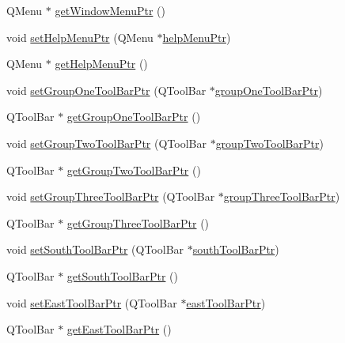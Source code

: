 \begin{DoxyCompactItemize}
\item 
Q\-Menu $\ast$ \hyperlink{class_master_gui_a68e66c032b5e7728e0a7e88a04575abc}{get\-Window\-Menu\-Ptr} ()
\item 
void \hyperlink{class_master_gui_a72a4772ee0ff74f6158f99e94c41189a}{set\-Help\-Menu\-Ptr} (Q\-Menu $\ast$\hyperlink{class_master_gui_a4125e9702c79a263642bf83f5f1e2192}{help\-Menu\-Ptr})
\item 
Q\-Menu $\ast$ \hyperlink{class_master_gui_a6eb5ec7778681673520dc9fffd080056}{get\-Help\-Menu\-Ptr} ()
\item 
void \hyperlink{class_master_gui_a83cb5a184a605d368841854ba1cb461b}{set\-Group\-One\-Tool\-Bar\-Ptr} (Q\-Tool\-Bar $\ast$\hyperlink{class_master_gui_a67441e41e16e245976536f18cd7f2d6d}{group\-One\-Tool\-Bar\-Ptr})
\item 
Q\-Tool\-Bar $\ast$ \hyperlink{class_master_gui_a7da1e17d6cfd6254a7b5da4be625e4ff}{get\-Group\-One\-Tool\-Bar\-Ptr} ()
\item 
void \hyperlink{class_master_gui_a677763f96267d87f843c61dff2d7e4ca}{set\-Group\-Two\-Tool\-Bar\-Ptr} (Q\-Tool\-Bar $\ast$\hyperlink{class_master_gui_aa2c7522e568a43f38861795af343bf76}{group\-Two\-Tool\-Bar\-Ptr})
\item 
Q\-Tool\-Bar $\ast$ \hyperlink{class_master_gui_a3559e8ead0441f1bfe9704f023665b44}{get\-Group\-Two\-Tool\-Bar\-Ptr} ()
\item 
void \hyperlink{class_master_gui_a4ee9de81a0827f42423f0c589cd4f1b4}{set\-Group\-Three\-Tool\-Bar\-Ptr} (Q\-Tool\-Bar $\ast$\hyperlink{class_master_gui_af620c7fd8a0903c84581a657d23ef45b}{group\-Three\-Tool\-Bar\-Ptr})
\item 
Q\-Tool\-Bar $\ast$ \hyperlink{class_master_gui_ae60fb73908b05d9f41eb78197163e10f}{get\-Group\-Three\-Tool\-Bar\-Ptr} ()
\item 
void \hyperlink{class_master_gui_a8d3dd60f8b7760d8e50eacd53b32e69a}{set\-South\-Tool\-Bar\-Ptr} (Q\-Tool\-Bar $\ast$\hyperlink{class_master_gui_a4a0234ba347ba345e79eff8c19ba27c8}{south\-Tool\-Bar\-Ptr})
\item 
Q\-Tool\-Bar $\ast$ \hyperlink{class_master_gui_af58b51918353ad37b1a8817098da1140}{get\-South\-Tool\-Bar\-Ptr} ()
\item 
void \hyperlink{class_master_gui_a5e58bb546e83e37dc826405a5bc3e8fe}{set\-East\-Tool\-Bar\-Ptr} (Q\-Tool\-Bar $\ast$\hyperlink{class_master_gui_a289b4db70744b812566a689bf368c37c}{east\-Tool\-Bar\-Ptr})
\item 
Q\-Tool\-Bar $\ast$ \hyperlink{class_master_gui_a88a3c0c4762455d7a4f416fe752b8723}{get\-East\-Tool\-Bar\-Ptr} ()

\end{DoxyCompactItemize}
